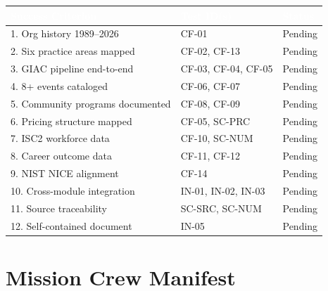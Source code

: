 \documentclass[11pt,letterpaper]{article}
\newcommand{\tableheader}[1]{\textbf{\sffamily\textcolor{white}{#1}}}
\begin{document}
\begin{center}
\begin{tabularx}{\textwidth}{XL{3cm}C{1.5cm}}
\toprule
{}
\tableheader{Success Criterion} & \tableheader{Test ID(s)} & \tableheader{Status} \\
. Org history 1989--2026 & CF-01 & Pending \\
2. Six practice areas mapped & CF-02, CF-13 & Pending \\
3. GIAC pipeline end-to-end & CF-03, CF-04, CF-05 & Pending \\
4. 8+ events cataloged & CF-06, CF-07 & Pending \\
5. Community programs documented & CF-08, CF-09 & Pending \\
6. Pricing structure mapped & CF-05, SC-PRC & Pending \\
7. ISC2 workforce data & CF-10, SC-NUM & Pending \\
8. Career outcome data & CF-11, CF-12 & Pending \\
9. NIST NICE alignment & CF-14 & Pending \\
10. Cross-module integration & IN-01, IN-02, IN-03 & Pending \\
11. Source traceability & SC-SRC, SC-NUM & Pending \\
12. Self-contained document & IN-05 & Pending \\
\bottomrule
\end{tabularx}
\end{center}

\section{Mission Crew Manifest}
\end{document}
